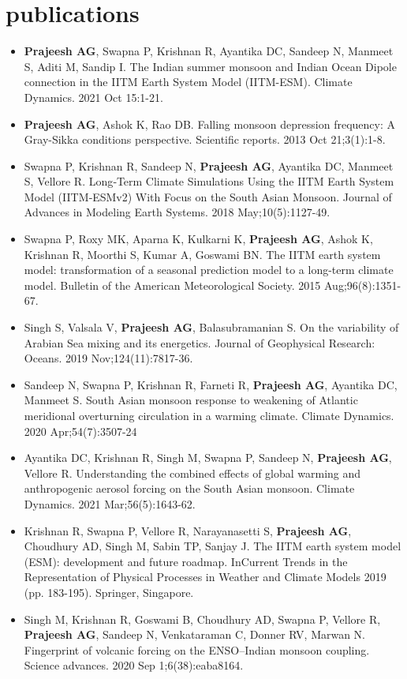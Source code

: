\documentclass[]{cv-style}          %
\begin{document}
\section{publications}
\begin{itemize}
    \item \textbf{Prajeesh AG}, Swapna P, Krishnan R, Ayantika DC, Sandeep N, Manmeet S, Aditi M, Sandip I. The Indian summer monsoon and Indian Ocean Dipole connection in the IITM Earth System Model (IITM-ESM). Climate Dynamics. 2021 Oct 15:1-21.
    \item \textbf{Prajeesh AG}, Ashok K, Rao DB. Falling monsoon depression frequency: A Gray-Sikka conditions perspective. Scientific reports. 2013 Oct 21;3(1):1-8.
    \item Swapna P, Krishnan R, Sandeep N, \textbf{Prajeesh AG}, Ayantika DC, Manmeet S, Vellore R. Long‐Term Climate Simulations Using the IITM Earth System Model (IITM‐ESMv2) With Focus on the South Asian Monsoon. Journal of Advances in Modeling Earth Systems. 2018 May;10(5):1127-49.
    \item Swapna P, Roxy MK, Aparna K, Kulkarni K, \textbf{Prajeesh AG}, Ashok K, Krishnan R, Moorthi S, Kumar A, Goswami BN. The IITM earth system model: transformation of a seasonal prediction model to a long-term climate model. Bulletin of the American Meteorological Society. 2015 Aug;96(8):1351-67.
    \item Singh S, Valsala V, \textbf{Prajeesh AG}, Balasubramanian S. On the variability of Arabian Sea mixing and its energetics. Journal of Geophysical Research: Oceans. 2019 Nov;124(11):7817-36.
    \item Sandeep N, Swapna P, Krishnan R, Farneti R, \textbf{Prajeesh AG}, Ayantika DC, Manmeet S. South Asian monsoon response to weakening of Atlantic meridional overturning circulation in a warming climate. Climate Dynamics. 2020 Apr;54(7):3507-24
    \item Ayantika DC, Krishnan R, Singh M, Swapna P, Sandeep N, \textbf{Prajeesh AG}, Vellore R. Understanding the combined effects of global warming and anthropogenic aerosol forcing on the South Asian monsoon. Climate Dynamics. 2021 Mar;56(5):1643-62.
    \item Krishnan R, Swapna P, Vellore R, Narayanasetti S, \textbf{Prajeesh AG}, Choudhury AD, Singh M, Sabin TP, Sanjay J. The IITM earth system model (ESM): development and future roadmap. InCurrent Trends in the Representation of Physical Processes in Weather and Climate Models 2019 (pp. 183-195). Springer, Singapore.
    \item Singh M, Krishnan R, Goswami B, Choudhury AD, Swapna P, Vellore R, \textbf{Prajeesh AG}, Sandeep N, Venkataraman C, Donner RV, Marwan N. Fingerprint of volcanic forcing on the ENSO–Indian monsoon coupling. Science advances. 2020 Sep 1;6(38):eaba8164.
\end{itemize}
\end{document}
